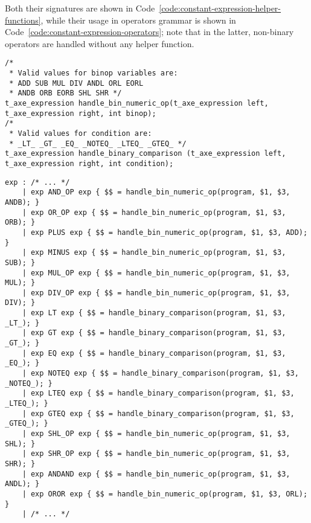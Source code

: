 \documentclass[english]{article}
\begin{document}
Both their signatures are shown in Code~\ref{code:constant-expression-helper-functions}, while their usage in operators grammar is shown in Code~\ref{code:constant-expression-operators};
note that in the latter, non-binary operators are handled without any helper function.

\begin{onepage}
  \begin{lstlisting}[language=LANCE, caption={Constant expression helper functions in \texttt{axe\_expression.h}}, label={code:constant-expression-helper-functions}]
/*
 * Valid values for binop variables are:
 * ADD SUB MUL DIV ANDL ORL EORL
 * ANDB ORB EORB SHL SHR */
t_axe_expression handle_bin_numeric_op(t_axe_expression left, t_axe_expression right, int binop);
/*
 * Valid values for condition are:
 * _LT_ _GT_ _EQ_ _NOTEQ_ _LTEQ_ _GTEQ_ */
t_axe_expression handle_binary_comparison (t_axe_expression left, t_axe_expression right, int condition);
\end{lstlisting}
\end{onepage}

\begin{onepage}
  \begin{lstlisting}[language=LANCE, caption={Constant expression operators via helper functions}, label={code:constant-expression-operators}]
exp : /* ... */
    | exp AND_OP exp { $$ = handle_bin_numeric_op(program, $1, $3, ANDB); }
    | exp OR_OP exp { $$ = handle_bin_numeric_op(program, $1, $3, ORB); }
    | exp PLUS exp { $$ = handle_bin_numeric_op(program, $1, $3, ADD); }
    | exp MINUS exp { $$ = handle_bin_numeric_op(program, $1, $3, SUB); }
    | exp MUL_OP exp { $$ = handle_bin_numeric_op(program, $1, $3, MUL); }
    | exp DIV_OP exp { $$ = handle_bin_numeric_op(program, $1, $3, DIV); }
    | exp LT exp { $$ = handle_binary_comparison(program, $1, $3, _LT_); }
    | exp GT exp { $$ = handle_binary_comparison(program, $1, $3, _GT_); }
    | exp EQ exp { $$ = handle_binary_comparison(program, $1, $3, _EQ_); }
    | exp NOTEQ exp { $$ = handle_binary_comparison(program, $1, $3, _NOTEQ_); }
    | exp LTEQ exp { $$ = handle_binary_comparison(program, $1, $3, _LTEQ_); }
    | exp GTEQ exp { $$ = handle_binary_comparison(program, $1, $3, _GTEQ_); }
    | exp SHL_OP exp { $$ = handle_bin_numeric_op(program, $1, $3, SHL); }
    | exp SHR_OP exp { $$ = handle_bin_numeric_op(program, $1, $3, SHR); }
    | exp ANDAND exp { $$ = handle_bin_numeric_op(program, $1, $3, ANDL); }
    | exp OROR exp { $$ = handle_bin_numeric_op(program, $1, $3, ORL); }
    | /* ... */
\end{lstlisting}
\end{onepage}
\end{document}

